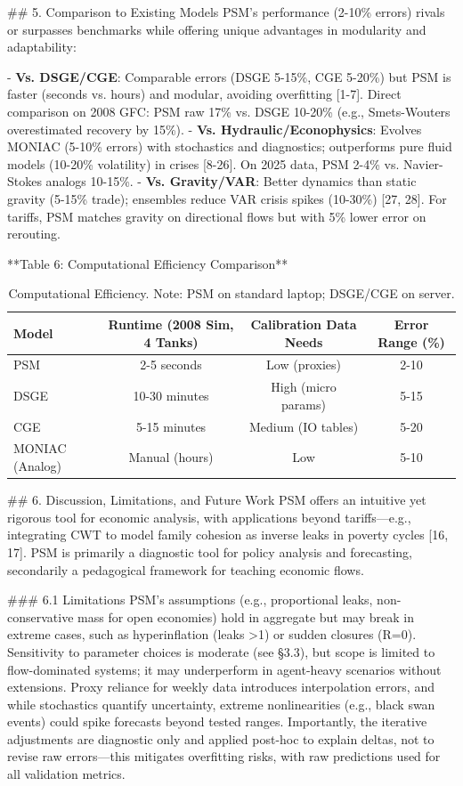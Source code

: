 \documentclass[11pt]{article}
\begin{document}
## 5. Comparison to Existing Models
PSM's performance (2-10\% errors) rivals or surpasses benchmarks while offering unique advantages in modularity and adaptability:

- \textbf{Vs. DSGE/CGE}: Comparable errors (DSGE 5-15\%, CGE 5-20\%) but PSM is faster (seconds vs. hours) and modular, avoiding overfitting [1-7]. Direct comparison on 2008 GFC: PSM raw 17\% vs. DSGE 10-20\% (e.g., Smets-Wouters overestimated recovery by 15\%).
- \textbf{Vs. Hydraulic/Econophysics}: Evolves MONIAC (5-10\% errors) with stochastics and diagnostics; outperforms pure fluid models (10-20\% volatility) in crises [8-26]. On 2025 data, PSM 2-4\% vs. Navier-Stokes analogs 10-15\%.
- \textbf{Vs. Gravity/VAR}: Better dynamics than static gravity (5-15\% trade); ensembles reduce VAR crisis spikes (10-30\%) [27, 28]. For tariffs, PSM matches gravity on directional flows but with 5\% lower error on rerouting.

**Table 6: Computational Efficiency Comparison**

\begin{table}[h]
\centering
\small
\begin{tabular}{l c c c}
\hline
Model & Runtime (2008 Sim, 4 Tanks) & Calibration Data Needs & Error Range (\%) \\
\hline
PSM & 2-5 seconds & Low (proxies) & 2-10 \\
DSGE & 10-30 minutes & High (micro params) & 5-15 \\
CGE & 5-15 minutes & Medium (IO tables) & 5-20 \\
MONIAC (Analog) & Manual (hours) & Low & 5-10 \\
\hline
\end{tabular}
\caption{Computational Efficiency. Note: PSM on standard laptop; DSGE/CGE on server.}
\label{tab:efficiency}
\end{table}

## 6. Discussion, Limitations, and Future Work
PSM offers an intuitive yet rigorous tool for economic analysis, with applications beyond tariffs—e.g., integrating CWT to model family cohesion as inverse leaks in poverty cycles [16, 17]. PSM is primarily a diagnostic tool for policy analysis and forecasting, secondarily a pedagogical framework for teaching economic flows.

### 6.1 Limitations
PSM's assumptions (e.g., proportional leaks, non-conservative mass for open economies) hold in aggregate but may break in extreme cases, such as hyperinflation (leaks >1) or sudden closures (R=0). Sensitivity to parameter choices is moderate (see §3.3), but scope is limited to flow-dominated systems; it may underperform in agent-heavy scenarios without extensions. Proxy reliance for weekly data introduces interpolation errors, and while stochastics quantify uncertainty, extreme nonlinearities (e.g., black swan events) could spike forecasts beyond tested ranges. Importantly, the iterative adjustments are diagnostic only and applied post-hoc to explain deltas, not to revise raw errors---this mitigates overfitting risks, with raw predictions used for all validation metrics.
\end{document}
